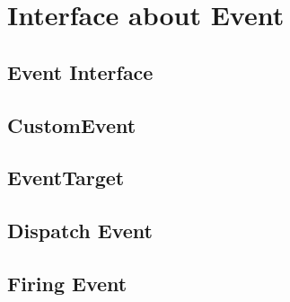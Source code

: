\chapter{Interface about Event}

\section{Event Interface}

\section{CustomEvent}

\section{EventTarget}

\section{Dispatch Event}

\section{Firing Event}
